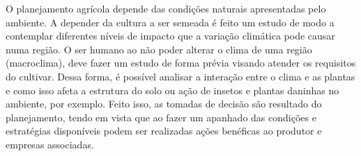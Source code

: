 \newpar O planejamento agrícola depende das condições naturais apresentadas pelo ambiente. A depender da cultura a ser semeada é feito um estudo de modo a contemplar diferentes níveis de impacto que a variação climática pode causar numa região. O ser humano ao não poder alterar o clima de uma região (macroclima), deve fazer um estudo de forma prévia visando atender os requisitos do cultivar. Dessa forma, é possível analisar a interação entre o clima e as plantas e como isso afeta a estrutura do solo ou ação de insetos e plantas daninhas no ambiente, por exemplo. Feito isso, as tomadas de decisão são resultado do planejamento, tendo em vista que ao fazer um apanhado das condições e estratégias disponíveis podem ser realizadas ações benéficas ao produtor e empresas associadas.